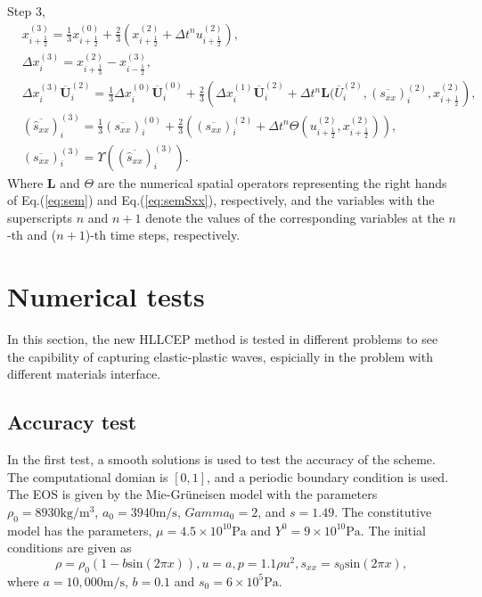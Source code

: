 \documentclass{article}
\numberwithin{equation}{section}
\numberwithin{table}{section}
\begin{document}
Step 3,
\begin{equation}
  \begin{aligned}
	& x_{i+\frac{1}{2}}^{(3)} = \frac{1}{3} x_{i+\frac{1}{2}}^{(0)}+\frac{2}{3} \left( x_{i+\frac{1}{2}}^{(2)}+\Delta t^n u_{i+\frac{1}{2}}^{(2)}\right),\\
	& \Delta x_i^{(3)} =  x_{i+\frac{1}{3}}^{(2)}- x_{i-\frac{1}{2}}^{(3)},\\
	& \Delta x_i^{(3)} \overline{\bm{U}}_i^{(2)}  = \frac{1}{3} \Delta x_i^{(0)} \overline{\bm{U}}_i^{(0)}+ \frac{2}{3} \left(  \Delta x_i^{(1)} \overline{\bm{U}}_i^{(2)} + \Delta t^n \bm{L}(\overline{U}_i^{(2)}, (\overline{s_{xx}})_i^{(2)}, x_{i+\frac{1}{2}}^{(2)} \right),\\
	& (\overline{\hat{s}_{xx}})_i^{(3)} =\frac{1}{3} (\overline{s_{xx}})_i^{(0)} + \frac{2}{3} \left(  (\overline{s_{xx}})_i^{(2)}+\Delta t^ n \varTheta (u_{i+\frac{1}{2}}^{(2)}, x_{i+\frac{1}{2}}^{(2)})\right),\\
  & (\overline{s_{xx}})_i^{(3)} = \Upsilon((\overline{\hat{s}_{xx}})_i^{(3)}).
\end{aligned}
\end{equation}
Where $\bm{L}$ and $\varTheta$ are the numerical spatial operators representing the right hands of Eq.(\ref{eq:sem}) and Eq.(\ref{eq:semSxx}), respectively, and the variables with the superscripts $n$ and $n+1$ denote the values of the corresponding variables at the $n$-th and ($n+1$)-th time steps, respectively.

\section{Numerical tests}
In this section, the new HLLCEP method  is tested  in different problems to see the capibility of  capturing elastic-plastic waves, espicially in the problem  with different materials interface. 

\subsection{Accuracy test}
In the first test, a smooth solutions is used to test the accuracy of the scheme. The computational domian is $[0,1]$, and a periodic boundary condition is used. The EOS is given by the Mie-Gr\"uneisen model with the parameters $\rho_0 = 8930 \text{kg}/\text{m}^3$, $a_0 = 3940 \text{m}/\text{s}$, $Gamma_0 =2$, and $s=1.49$. The constitutive model has the parameters, $\mu = 4.5\times 10^10 \text{Pa}$ and $Y^0 = 9\times 10^10 \text{Pa}$.  The initial conditions are given as 
\begin{equation}
  \rho = \rho_0(1-b \text{sin}(2\pi x)), u = a, p = 1.1\rho u^2, s_{xx} = s_0 \text{sin}(2\pi x),
\end{equation}
where $a = 10,000\text{m}/\text{s}$, $ b = 0.1$  and  $s_0 = 6\times 10^5 \text{Pa}$.
\end{document}
